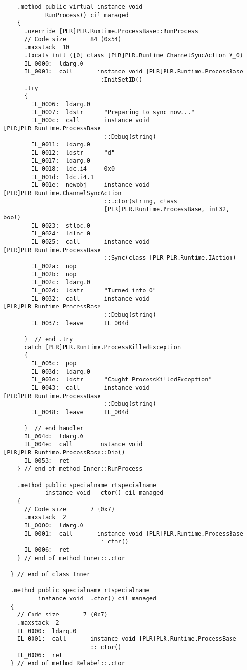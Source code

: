 \begin{lstlisting}
    .method public virtual instance void 
            RunProcess() cil managed
    {
      .override [PLR]PLR.Runtime.ProcessBase::RunProcess
      // Code size       84 (0x54)
      .maxstack  10
      .locals init ([0] class [PLR]PLR.Runtime.ChannelSyncAction V_0)
      IL_0000:  ldarg.0
      IL_0001:  call       instance void [PLR]PLR.Runtime.ProcessBase
                           ::InitSetID()
      .try
      {
        IL_0006:  ldarg.0
        IL_0007:  ldstr      "Preparing to sync now..."
        IL_000c:  call       instance void [PLR]PLR.Runtime.ProcessBase
                             ::Debug(string)
        IL_0011:  ldarg.0
        IL_0012:  ldstr      "d"
        IL_0017:  ldarg.0
        IL_0018:  ldc.i4     0x0
        IL_001d:  ldc.i4.1
        IL_001e:  newobj     instance void [PLR]PLR.Runtime.ChannelSyncAction
                             ::.ctor(string, class 
                             [PLR]PLR.Runtime.ProcessBase, int32, bool)
        IL_0023:  stloc.0
        IL_0024:  ldloc.0
        IL_0025:  call       instance void [PLR]PLR.Runtime.ProcessBase
                             ::Sync(class [PLR]PLR.Runtime.IAction)
        IL_002a:  nop
        IL_002b:  nop
        IL_002c:  ldarg.0
        IL_002d:  ldstr      "Turned into 0"
        IL_0032:  call       instance void [PLR]PLR.Runtime.ProcessBase
                             ::Debug(string)
        IL_0037:  leave      IL_004d

      }  // end .try
      catch [PLR]PLR.Runtime.ProcessKilledException 
      {
        IL_003c:  pop
        IL_003d:  ldarg.0
        IL_003e:  ldstr      "Caught ProcessKilledException"
        IL_0043:  call       instance void [PLR]PLR.Runtime.ProcessBase
                             ::Debug(string)
        IL_0048:  leave      IL_004d

      }  // end handler
      IL_004d:  ldarg.0
      IL_004e:  call       instance void [PLR]PLR.Runtime.ProcessBase::Die()
      IL_0053:  ret
    } // end of method Inner::RunProcess

    .method public specialname rtspecialname 
            instance void  .ctor() cil managed
    {
      // Code size       7 (0x7)
      .maxstack  2
      IL_0000:  ldarg.0
      IL_0001:  call       instance void [PLR]PLR.Runtime.ProcessBase
                           ::.ctor()
      IL_0006:  ret
    } // end of method Inner::.ctor

  } // end of class Inner

  .method public specialname rtspecialname 
          instance void  .ctor() cil managed
  {
    // Code size       7 (0x7)
    .maxstack  2
    IL_0000:  ldarg.0
    IL_0001:  call       instance void [PLR]PLR.Runtime.ProcessBase
                         ::.ctor()
    IL_0006:  ret
  } // end of method Relabel::.ctor


\end{lstlisting}
